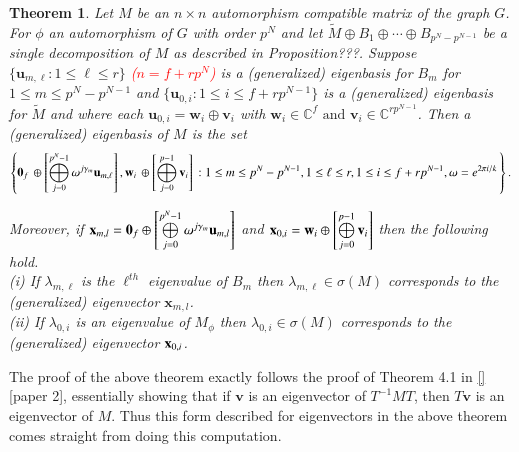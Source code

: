 \documentclass[preprint,12pt]{elsarticle}
\newtheorem{theorem}{Theorem}
\theoremstyle{definition}
\theoremstyle{remark}
\begin{document}
\begin{theorem}
Let $M$ be an $n\times n$ automorphism compatible matrix of the graph $G$. For $\phi$ an automorphism of $G$ with order $p^N$ and let $\tilde{M} \oplus B_1\oplus \cdots \oplus B_{p^N-p^{N-1}}$ be a single decomposition of $M$ as described in Proposition???. Suppose $\{\mathbf{u}_{m,\ell}:1\leq \ell \leq r\}$ \textcolor{red}{($n=f+rp^N$)}  is a (generalized) eigenbasis for $B_m$  for $1\leq m\leq p^N-p^{N-1}$ and $\{{{\mathbf{u}}_{0,i}}:1\leq i\leq f+rp^{N-1}\}$ is a (generalized) eigenbasis for $\tilde{M}$ and where each ${\mathbf{u}}_{0,i}= {{\mathbf{w}}_i} \oplus {{\mathbf{v}}_i}$ with ${{\mathbf{w}}_i}\in\mathbb{C}^f\text{ and }{{\mathbf{v}}_i}\in\mathbb{C}^{rp^{N-1}}$. Then a (generalized) eigenbasis of $M$ is the set
\begin{equation}\label{eq:vect}
\left\{{{\bf{0}}_f}\, \oplus {\left[ {\mathop  \bigoplus \limits_{j = 0}^{p^N-1} {\omega ^{j \gamma_m}}{{\bf{u}}_{m,\ell}}} \right] ,{{\bf{w}}_i}\,\oplus \left[   {\mathop  \bigoplus \limits_{j = 0}^{p - 1} {{\bf{v}}_i}} \right]\,:1 \leq m \leq p^N-p^{N-1}, 1 \leq \ell \leq r,1 \leq i \leq f + rp^{N-1},\omega=e^{2\pi i/k}\,} \right\}.
\end{equation}

Moreover, if $\mathbf{x}_{m,l}={{\bf{0}}_f}\oplus \left[ {\mathop  \bigoplus \limits_{j = 0}^{p^N - 1} {\omega ^{j\gamma_m}}{{\bf{u}}_{m,l}}} \right]$ and ${{\bf{x}}_{0,i}} =  {{\bf{w}}_i} \oplus \left[{\mathop  \bigoplus \limits_{j = 0}^{p - 1} {{\bf{v}}_i}} \right]$ then the following hold.\\
(i) If $\lambda_{m,\ell}$ is the $\ell^{th}$ eigenvalue of $B_m$ then $\lambda_{m,\ell}\in\sigma(M)$ corresponds to the (generalized) eigenvector $\mathbf{x}_{m,l}$.\\
(ii) If $\lambda_{0,i}$ is an eigenvalue of $M_\phi$ then $\lambda_{0,i}\in\sigma(M)$ corresponds to the (generalized) eigenvector ${{\bf{x}}_{0,i}}$.
\end{theorem}
The proof of the above theorem exactly follows the proof of Theorem 4.1 in \ref{}[paper 2], essentially showing that if $\mathbf{v}$ is an eigenvector of $T^{-1}MT$, then $T\mathbf{v}$ is an eigenvector of $M$. Thus this form described for eigenvectors in the above theorem comes straight from doing this computation.
\end{document}
